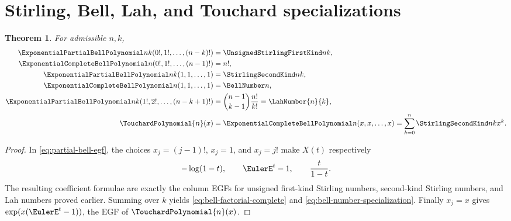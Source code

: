 \documentclass[11pt,a4paper,oneside,openany]{book}
\newtheorem{theorem}{Theorem}[chapter]
\theoremstyle{definition}
\theoremstyle{remark}
\begin{document}
\section{Stirling, Bell, Lah, and Touchard specializations}
\begin{theorem}\label{thm:bell-poly-specializations}
For admissible $n,k$,
\begin{align}
 \ExponentialPartialBellPolynomial nk(0!,1!,\ldots,(n-k)!)&=\UnsignedStirlingFirstKind nk,
 \label{eq:bell-first-specialization}\\
 \ExponentialCompleteBellPolynomial n(0!,1!,\ldots,(n-1)!)&=n!,
 \label{eq:bell-factorial-complete}\\
 \ExponentialPartialBellPolynomial nk(1,1,\ldots,1)&=\StirlingSecondKind nk,
 \label{eq:bell-second-specialization}\\
 \ExponentialCompleteBellPolynomial n(1,1,\ldots,1)&=\BellNumber n,
 \label{eq:bell-number-specialization}\\
 \ExponentialPartialBellPolynomial nk(1!,2!,\ldots,(n-k+1)!)
 &=\binom{n-1}{k-1}\frac{n!}{k!}=\LahNumber{n}{k},
 \label{eq:bell-lah-specialization}\\
 \TouchardPolynomial{n}(x)&=\ExponentialCompleteBellPolynomial n(x,x,\ldots,x)
 =\sum_{k=0}^{n}\StirlingSecondKind nkx^k.
 \label{eq:touchard-bell-specialization}
\end{align}
\end{theorem}
\begin{proof}
In \eqref{eq:partial-bell-egf}, the choices $x_j=(j-1)!$, $x_j=1$, and
$x_j=j!$ make $X(t)$ respectively
\[
 -\log(1-t),\qquad \EulerE^t-1,\qquad \frac{t}{1-t}.
\]
The resulting coefficient formulae are exactly the column EGFs for unsigned
first-kind Stirling numbers, second-kind Stirling numbers, and Lah numbers proved
earlier.  Summing over $k$ yields \eqref{eq:bell-factorial-complete} and
\eqref{eq:bell-number-specialization}.  Finally $x_j=x$ gives
$\exp(x(\EulerE^t-1))$, the EGF of $\TouchardPolynomial{n}(x)$.
\end{proof}
\end{document}
